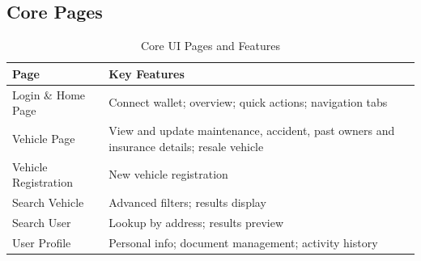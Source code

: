 \documentclass[12pt,a4paper]{article}
\begin{document}
    \subsection{Core Pages}
    \begin{table}[H]
        \begin{tabular}{@{}p{4cm}p{11cm}@{}}
            \toprule
            \textbf{Page}        & \textbf{Key Features}                                                                    \\
            \midrule
            Login \& Home Page   & Connect wallet; overview; quick actions; navigation tabs                                 \\
            Vehicle Page         & View and update maintenance, accident, past owners and insurance details; resale vehicle \\
            Vehicle Registration & New vehicle registration                                                                 \\
            Search Vehicle       & Advanced filters; results display                                                        \\
            Search User          & Lookup by address; results preview                                                       \\
            User Profile         & Personal info; document management; activity history                                     \\
            \bottomrule
        \end{tabular}
        \caption{Core UI Pages and Features}
        \label{tab:ui-pages}
    \end{table}
\end{document}
